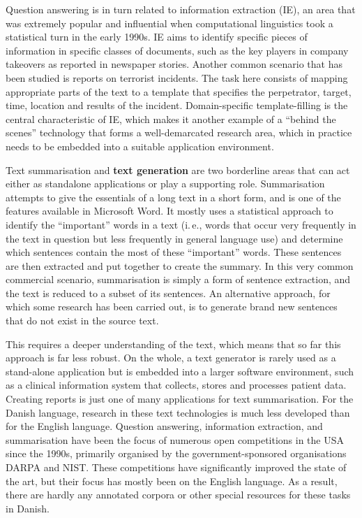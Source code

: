\begin{multicols}{2}
Question answering is in turn related to information extraction (IE), an area that was extremely popular and influential when computational linguistics took a statistical turn in the early 1990s. IE aims to identify specific pieces of information in specific classes of documents, such as the key players in company takeovers as reported in newspaper stories. Another common scenario that has been studied is reports on terrorist incidents. The task here consists of mapping appropriate parts of the text to a template that specifies the perpetrator, target, time, location and results of the incident. Domain-specific template-filling is the central characteristic of IE, which makes it another example of a “behind the scenes” technology that forms a well-demarcated research area, which in practice needs to be embedded into a suitable application environment. 

    Text summarisation and \textbf{text generation} are two borderline areas that can act either as standalone applications or play a supporting role. Summarisation attempts to give the essentials of a long text in a short form, and is one of the features available in Microsoft Word. It mostly uses a statistical approach to identify the “important” words in a text (i.\,e., words that occur very frequently in the text in question but less frequently in general language use) and determine which sentences contain the most of these “important” words. These sentences are then extracted and put together to create the summary. In this very common commercial scenario, summarisation is simply a form of sentence extraction, and the text is reduced to a subset of its sentences. An alternative approach, for which some research has been carried out, is to generate brand new sentences that do not exist in the source text. 


This requires a deeper understanding of the text, which means that so far this approach is far less robust. On the whole, a text generator is rarely used as a stand-alone application but is embedded into a larger software environment, such as a clinical information system that collects, stores and processes patient data. Creating reports is just one of many applications for text summarisation. 
For the Danish language, research in these text technologies is much less developed than for the Eng\-lish language. Question answering, information extraction, and summarisation have been the focus of numerous open competitions in the USA since the 1990s, primarily organised by the government-sponsored organisations DARPA and NIST. These competitions have significantly improved the state of the art, but their focus has mostly been on the English language. As a result, there are hardly any annotated corpora or other special resources for these tasks in Danish. 


\end{multicols}

